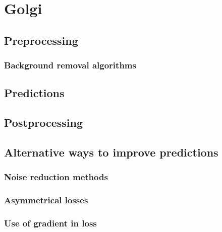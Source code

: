 \section{Golgi}
    \subsection{Preprocessing}
        
        \subsubsection{Background removal algorithms}
    \subsection{Predictions}
    \subsection{Postprocessing}
    \subsection{Alternative ways to improve predictions}
        \subsubsection{Noise reduction methods}
        \subsubsection{Asymmetrical losses}
        \subsubsection{Use of gradient in loss}
